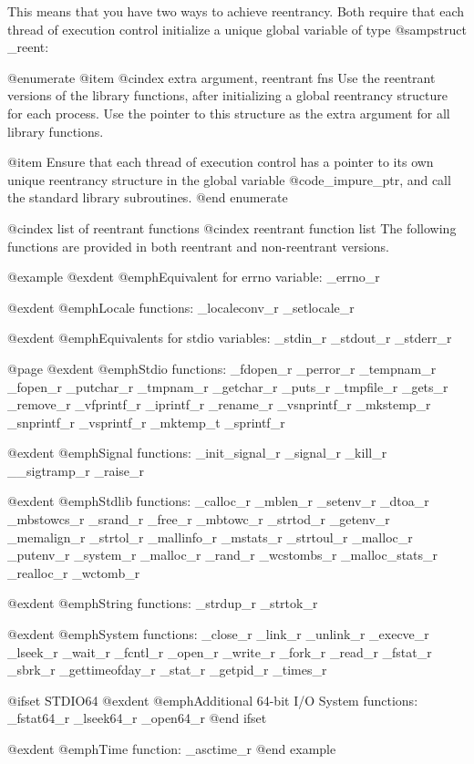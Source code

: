 This means that you have two ways to achieve reentrancy.  Both require
that each thread of execution control initialize a unique global
variable of type @samp{struct _reent}:

@enumerate
@item
@cindex extra argument, reentrant fns
Use the reentrant versions of the library functions, after initializing
a global reentrancy structure for each process.  Use the pointer to this
structure as the extra argument for all library functions.

@item
Ensure that each thread of execution control has a pointer to its own
unique reentrancy structure in the global variable @code{_impure_ptr},
and call the standard library subroutines.
@end enumerate

@cindex list of reentrant functions
@cindex reentrant function list
The following functions are provided in both reentrant
and non-reentrant versions.

@example
@exdent @emph{Equivalent for errno variable:}
_errno_r

@exdent @emph{Locale functions:}
_localeconv_r  _setlocale_r

@exdent @emph{Equivalents for stdio variables:}
_stdin_r        _stdout_r       _stderr_r

@page  
@exdent @emph{Stdio functions:}
_fdopen_r       _perror_r       _tempnam_r
_fopen_r        _putchar_r      _tmpnam_r
_getchar_r      _puts_r         _tmpfile_r
_gets_r         _remove_r       _vfprintf_r
_iprintf_r      _rename_r       _vsnprintf_r
_mkstemp_r      _snprintf_r     _vsprintf_r
_mktemp_t       _sprintf_r

@exdent @emph{Signal functions:}
_init_signal_r  _signal_r
_kill_r         __sigtramp_r
_raise_r

@exdent @emph{Stdlib functions:}
_calloc_r       _mblen_r        _setenv_r
_dtoa_r         _mbstowcs_r     _srand_r
_free_r         _mbtowc_r       _strtod_r
_getenv_r       _memalign_r     _strtol_r
_mallinfo_r     _mstats_r       _strtoul_r
_malloc_r       _putenv_r       _system_r
_malloc_r       _rand_r         _wcstombs_r
_malloc_stats_r _realloc_r      _wctomb_r

@exdent @emph{String functions:}
_strdup_r       _strtok_r

@exdent @emph{System functions:}
_close_r        _link_r         _unlink_r
_execve_r       _lseek_r        _wait_r
_fcntl_r        _open_r         _write_r 
_fork_r         _read_r
_fstat_r        _sbrk_r
_gettimeofday_r _stat_r
_getpid_r       _times_r

@ifset STDIO64
@exdent @emph{Additional 64-bit I/O System functions:}
_fstat64_r	_lseek64_r	_open64_r
@end ifset

@exdent @emph{Time function:}
_asctime_r
@end example
